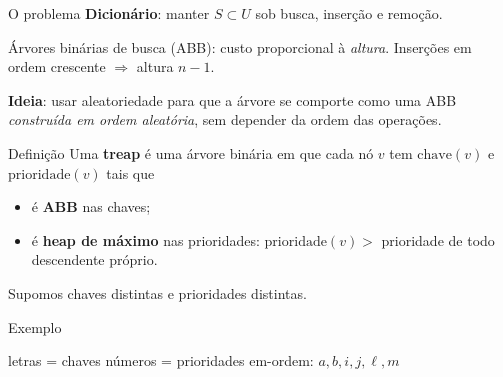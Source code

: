\documentclass[aspectratio=169,11pt]{beamer}
\newcommand{\define}[1]{\textbf{#1}}
\theoremstyle{definition}
\begin{document}
\begin{frame}{O problema}
  \textbf{Dicionário}: manter $S\subset U$ sob busca, inserção e remoção.
  \pause
  \vspace{1ex}
 
  Árvores binárias de busca (ABB): custo proporcional à \emph{altura}.
  Inserções em ordem crescente $\Rightarrow$ altura $n-1$.
  \pause
  \vspace{1ex}
 
  \textbf{Ideia}: usar aleatoriedade para que a árvore se comporte como
  uma ABB \emph{construída em ordem aleatória}, sem depender da ordem
  das operações.
\end{frame}
 
\begin{frame}{Definição}
  Uma \define{treap} é uma árvore binária em que cada nó $v$ tem
  $\mathrm{chave}(v)$ e $\mathrm{prioridade}(v)$ tais que
  \begin{itemize}
  \item é \textbf{ABB} nas chaves;
  \item é \textbf{heap de máximo} nas prioridades:
    $\mathrm{prioridade}(v)>$ prioridade de todo descendente próprio.
  \end{itemize}
  \vspace{1ex}
  Supomos chaves distintas e prioridades distintas.
\end{frame}
 
\begin{frame}{Exemplo}
  \centering
 
  \vfill
 
  \small letras = chaves \quad números = prioridades \quad
  em-ordem: $a,b,i,j,\ell,m$
\end{frame}
 
\end{document}
